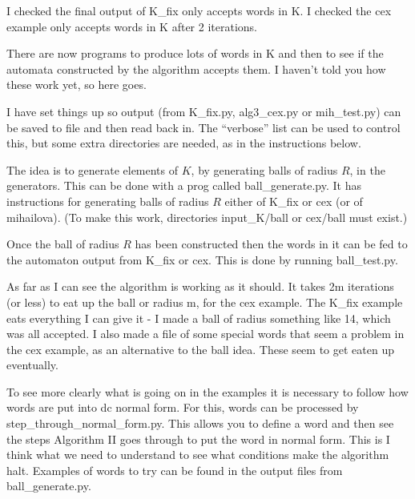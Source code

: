 \documentclass[a4paper,12pt]{article}
\numberwithin{equation}{section}
\numberwithin{figure}{section}
\begin{document}
I checked the final output of K\_fix only accepts words in K. I checked the cex example only accepts words in K
after 2 iterations. 

There are now programs to produce lots of words in K and then to see if the automata constructed 
by the algorithm accepts them.  I haven't told you how these work  yet, so here goes.

I have set things up so output (from K\_fix.py, alg3\_cex.py or mih\_test.py) can be saved to file and then read back in.
The ``verbose'' list can be used to control this, but some extra directories are needed, as in the instructions below. 

The idea is to generate elements of $K$, by generating balls of radius $R$, in the generators. 
This can be done with a prog called ball\_generate.py. It has instructions for generating 
balls of radius $R$ either of K\_fix or cex (or of mihailova). 
(To make this work, directories input\_K/ball or cex/ball must exist.)

Once the ball of radius $R$ has been constructed then the words in it can be fed to the automaton output
from K\_fix or cex. This is done by running ball\_test.py. 

As far as I can see the algorithm is working as it should. It takes 2m iterations (or less) to eat up the ball or radius m,
for the cex example. The K\_fix example eats everything I can give it - I made a ball of radius something like 14, which was 
all accepted. I also made a file of some special words that seem a problem in the cex example, as an alternative
to the ball idea. These  seem to get eaten up eventually. 

To see more clearly what is going on in the examples it is necessary to follow how words are put into
dc normal form. For this, words can be processed by step\_through\_normal\_form.py.
This allows you to define a word and then 
see the steps Algorithm II goes through to put the word in normal form. This is I think what we 
need to understand to see what conditions make the algorithm halt. Examples of words to try can be found in the
output files from ball\_generate.py.
\end{document}
